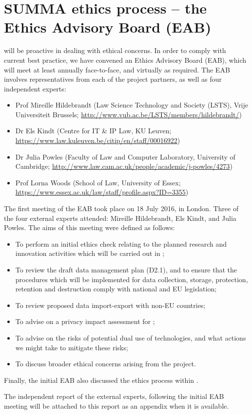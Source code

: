 \section{SUMMA ethics process -- the Ethics Advisory Board (EAB)}
\label{sec:process}

\project will be proactive in dealing with ethical concerns. In order to comply with current best practice, we have convened an Ethics Advisory Board (EAB), which  will meet at least annually face-to-face, and virtually as required. The EAB involves representatives from each of the project partners, as well as four independent experts:
\begin{itemize}
    \item Prof Mireille Hildebrandt (Law Science Technology and Society (LSTS), Vrije Universiteit Brussels; \url{http://www.vub.ac.be/LSTS/members/hildebrandt/})
    \item Dr Els Kindt (Centre for IT \& IP Law, KU Leuven; \url{https://www.law.kuleuven.be/citip/en/staff/00016922})
    \item Dr Julia Powles (Faculty of Law and Computer Laboratory, University of Cambridge; \url{http://www.law.cam.ac.uk/people/academic/j-powles/4273})
    \item Prof Lorna Woods (School of Law, University of Essex; \url{https://www.essex.ac.uk/law/staff/profile.aspx?ID=3355})
\end{itemize}

The first meeting of the EAB took place on 18 July 2016, in London. Three of the four external experts attended: Mireille Hildebrandt, Els Kindt, and Julia Powles.  The aims of this meeting were defined as follows:
\begin{itemize}
\item 
To perform an initial ethics check relating to the planned research and innovation activities which will be carried out in \project;
\item 
To review the draft data management plan (D2.1), and to ensure that the procedures which will be implemented for data collection, storage, protection, retention and destruction comply with national and EU legislation;
\item 
To review proposed data import-export with non-EU countries;
\item 
To advise on a privacy impact assessment for \project;
\item 
To advise on the risks of potential dual use of \project technologies, and what actions we might take to mitigate these risks;
\item 
To discuss broader ethical concerns arising from the \project project.
\end{itemize}
Finally, the initial EAB also discussed the ethics process within \project.

 The independent report of the external experts, following the initial EAB meeting will be attached to this report as an appendix when it is available.
    